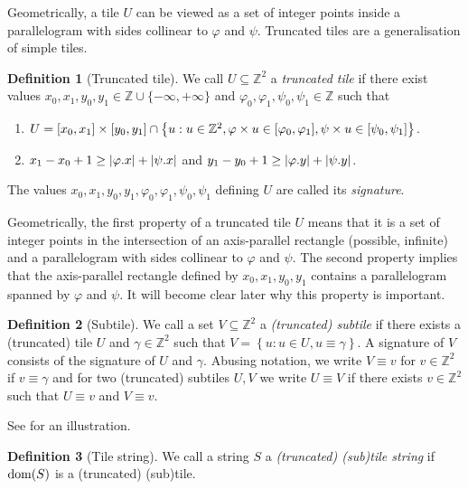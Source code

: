 \documentclass[11pt, letterpaper]{article}
\theoremstyle{plain}
\theoremstyle{definition}
\newtheorem{definition}{Definition}
\theoremstyle{remark}
\newcommand{\Z}{\mathbb{Z}}
\renewcommand{\phi}{\varphi}
\newcommand{\set}[1]{\left\lbrace #1 \right\rbrace}
\begin{document}
Geometrically, a tile $U$ can be viewed as a set of integer points inside a parallelogram with sides collinear to $\phi$ and $\psi$. Truncated tiles are a generalisation of simple tiles. 

\begin{definition}[Truncated tile]
We call $U \subseteq \Z^2$ a \emph{truncated tile} if there exist values $x_0, x_1, y_0, y_1 \in \Z \cup \{-\infty, +\infty\}$ and $\phi_0, \phi_1, \psi_0, \psi_1 \in \Z$ such that 
	\begin{enumerate}
		\item $U = [x_0, x_1] \times [y_0, y_1] \cap \set{u : u \in \Z^2, \h{u} \in [\phi_0, \phi_1], \s{u} \in [\psi_0, \psi_1]}$. 
		\item $x_1 - x_0 + 1 \ge |\x{\phi}| + |\x{\psi}|$ and $y_1 - y_0 + 1 \ge |\y{\phi}| + |\y{\psi}|$. 
	\end{enumerate}
The values $x_0, x_1, y_0, y_1, \phi_0, \phi_1, \psi_0, \psi_1$ defining $U$ are called its \emph{signature}. 
\end{definition}

Geometrically, the first property of a truncated tile $U$ means that it is a set of integer points in the intersection of an axis-parallel rectangle (possible, infinite) and a parallelogram with sides collinear to $\phi$ and $\psi$. The second property implies that the axis-parallel rectangle defined by $x_0, x_1, y_0, y_1$ contains a parallelogram spanned by $\phi$ and $\psi$. It will become clear later why this property is important. 

\begin{definition}[Subtile]\label{subtile_definition}
We call a set $V \subseteq \Z^2$ a \emph{(truncated) subtile} if there exists a (truncated) tile $U$ and $\gamma \in \Z^2$ such that $V = \set{u : u \in U, u \equiv \gamma}$. A signature of $V$ consists of the signature of $U$ and $\gamma$. Abusing notation, we write $V \equiv v$ for $v \in \Z^2$ if $v \equiv \gamma$ and for two (truncated) subtiles $U,V$ we write $U \equiv V$ if there exists $v \in \Z^2$ such that $U \equiv v$ and $V \equiv v$.
\end{definition}

See  for an illustration.

\begin{definition}[Tile string]\label{tile_string_definition}
We call a string $S$ a \emph{(truncated) (sub)tile string} if $\operatorname*{dom}(S)$ is a (truncated) (sub)tile.
\end{definition}
\end{document}
